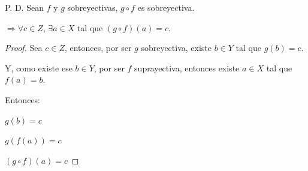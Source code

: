 \documentclass{article}
\begin{document}
\begin{enumerate}
\begin{enumerate}
        P. D. Sean \(f\) y \(g\) sobreyectivas, \(g \circ f\) es sobreyectiva.
        
        \(\Rightarrow \forall c \in Z\), \(\exists a \in X\) tal que \((g \circ f)(a) = c\).
        
        \begin{proof} Sea \(c \in Z\), entonces, por ser \(g\) sobreyectiva, existe \(b \in Y\) tal que \(g(b) = c\).
        \vspace{\baselineskip}
        
        Y, como existe ese \(b \in Y\), por ser \(f\) suprayectiva, entonces existe \(a \in X\) tal que \(f(a) = b\).
        \vspace{\baselineskip}
        
        Entonces:
        
        \(g(b) = c\)
        
        \(g(f(a)) = c\)
        
        \((g \circ f)(a) = c\)
        \end{proof}
    \end{enumerate}
\end{enumerate}
\end{document}
